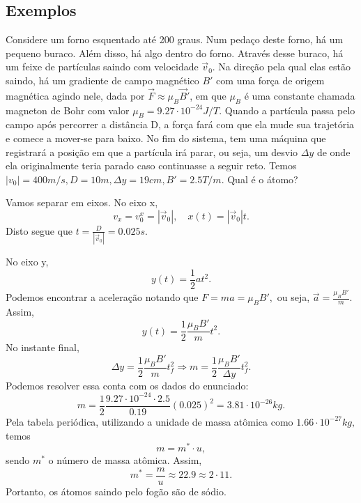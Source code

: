 \documentclass[PhysicsI/physics_notes.tex]{subfiles}
\begin{document}
\subsection{Exemplos}
\begin{example}
	Considere um forno esquentado até 200 graus. Num pedaço deste forno, há um pequeno buraco. Além disso, há algo dentro do forno.
	Através desse buraco, há um feixe de partículas saindo com velocidade $\vec{v}_{0}$. Na direção pela qual elas estão saindo,
	há um gradiente de campo magnético $B'$ com uma força de origem magnética agindo nele, dada por $\vec{F}\approx \mu_{B}\vec{B}'$,
	em que $\mu_{B}$ é uma constante chamada magneton de Bohr com valor $\mu_{B}=9.27 \cdot 10^{-24}J/T.$ Quando a partícula passa pelo
	campo após percorrer a distância D, a força fará com que ela mude sua trajetória e comece a mover-se para baixo. No fim do sistema, tem uma máquina
	que registrará a posição em que a partícula irá parar, ou seja, um desvio $\Delta y$ de onde ela originalmente
	teria parado caso continuasse a seguir reto.
	Temos $|v_{0}|=400m/s, D = 10m, \Delta y = 19cm, B' = 2.5T/m.$ Qual é o átomo?

	Vamos separar em eixos. No eixo x,
	$$
		v_{x} = v_{0}^{x} = |\vec{v}_{0}|,\quad x(t) = |\vec{v}_{0}|t.
	$$
	Disto segue que $t = \frac{D}{|\vec{v}_{0}|} = 0.025s.$

	No eixo y,
	$$
		y(t) = \frac{1}{2}at^{2}.
	$$
	Podemos encontrar a aceleração notando que $F = ma = \mu_{B}B',$ ou seja, $\vec{a} = \frac{\mu_{B}B'}{m}$. Assim,
	$$
		y(t) = \frac{1}{2}\frac{\mu_{B}B'}{m}t^{2}.
	$$
	No instante final,
	$$
		\Delta y=\frac{1}{2}\frac{\mu_{B}B'}{m}t_{f}^{2} \Rightarrow m = \frac{1}{2}\frac{\mu_{B}B'}{\Delta y}t_{f}^{2}.
	$$
	Podemos resolver essa conta com os dados do enunciado:
	$$
		m = \frac{1}{2}\frac{9.27 \cdot 10^{-24}\cdot 2.5}{0.19}(0.025)^{2} = 3.81 \cdot 10^{-26}kg.
	$$
	Pela tabela periódica, utilizando a unidade de massa atômica como $1.66 \cdot 10^{-27}kg,$ temos
	$$
		m = m^{*}\cdot u,
	$$
	sendo $m^{*}$ o número de massa atômica. Assim,
	$$
		m^{*} = \frac{m}{u}\approx 22.9\approx 2 \cdot 11.
	$$
	Portanto, os átomos saindo pelo fogão são de sódio.
\end{example}
\end{document}
